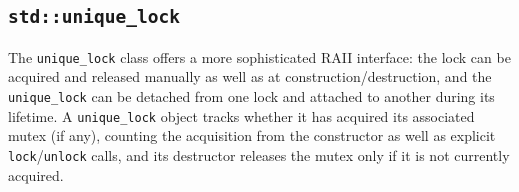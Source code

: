 \documentclass[acmsmall,screen,review,anonymous]{acmart}
\begin{document}
\subsection{\lstinline{std::unique_lock}}
The \lstinline{unique_lock} class offers a more sophisticated RAII interface: the lock can be acquired and released manually as well as at construction/destruction, and the \lstinline{unique_lock} can be detached from one lock and attached to another during its lifetime. A \lstinline{unique_lock} object tracks whether it has acquired its associated mutex (if any), counting the acquisition from the constructor as well as explicit \lstinline{lock}/\lstinline{unlock} calls, and its destructor releases the mutex only if it is not currently acquired. %
\end{document}
